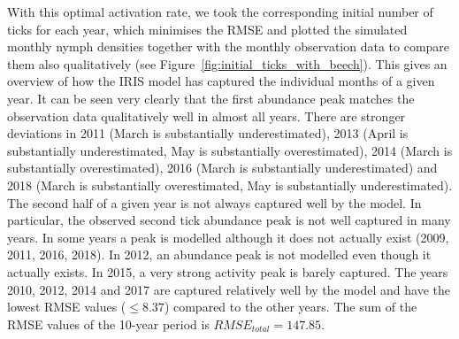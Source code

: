 \documentclass[a4paper, 11pt]{scrartcl}
\begin{document}
With this optimal activation rate, we took the corresponding initial number of ticks for each year, which minimises the RMSE and plotted the simulated monthly nymph densities
together with the monthly observation data to compare them also qualitatively (see Figure~\ref{fig:initial_ticks_with_beech}). This gives an overview of how the IRIS model
has captured the individual months of a given year. It can be seen very clearly that the first abundance peak matches the observation data qualitatively well in almost all years.
There are stronger deviations in 2011 (March is substantially underestimated), 2013 (April is substantially underestimated, May is substantially overestimated), 2014 (March is
substantially overestimated), 2016 (March is substantially underestimated) and 2018 (March is substantially overestimated, May is substantially underestimated). The second half
of a given year is not always captured well by the model. In particular, the observed second tick abundance peak is not well captured in many years. In some years a peak is
modelled although it does not actually exist (2009, 2011, 2016, 2018). In 2012, an abundance peak is not modelled even though it actually exists. In 2015, a very strong activity
peak is barely captured. The years 2010, 2012, 2014 and 2017 are captured relatively well by the model and have the lowest RMSE values ($\leq 8.37$) compared to the other years.
The sum of the RMSE values of the 10-year period is $RMSE_{total} = 147.85$.
\end{document}
